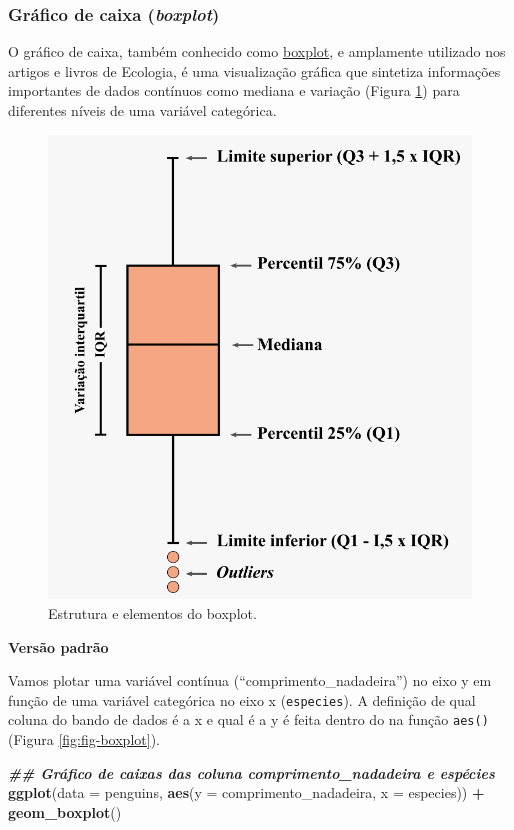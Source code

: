 \documentclass[
]{article}
\newenvironment{Shaded}{\begin{snugshade}}{\end{snugshade}}
\newcommand{\AttributeTok}[1]{\textcolor[rgb]{0.13,0.29,0.53}{#1}}
\newcommand{\DocumentationTok}[1]{\textcolor[rgb]{0.56,0.35,0.01}{\textbf{\textit{#1}}}}
\newcommand{\FunctionTok}[1]{\textcolor[rgb]{0.13,0.29,0.53}{\textbf{#1}}}
\newcommand{\NormalTok}[1]{#1}
\newcommand{\SpecialCharTok}[1]{\textcolor[rgb]{0.81,0.36,0.00}{\textbf{#1}}}
\begin{document}
\hypertarget{gruxe1fico-de-caixa-boxplot}{%
\subsubsection{\texorpdfstring{Gráfico de caixa (\emph{boxplot})}{Gráfico de caixa (boxplot)}}\label{gruxe1fico-de-caixa-boxplot}}

O gráfico de caixa, também conhecido como \href{https://www.data-to-viz.com/caveat/boxplot.html}{boxplot}, e amplamente utilizado nos artigos e livros de Ecologia, é uma visualização gráfica que sintetiza informações importantes de dados contínuos como mediana e variação (Figura \ref{fig:fig-boxplot-desc}) para diferentes níveis de uma variável categórica.

\begin{figure}
\includegraphics[width=0.75\linewidth,height=0.75\textheight]{figures/cap06_fig03} \caption{Estrutura e elementos do boxplot.}\label{fig:fig-boxplot-desc}
\end{figure}

\textbf{Versão padrão}

Vamos plotar uma variável contínua (``comprimento\_nadadeira'') no eixo y em função de uma variável categórica no eixo x (\texttt{especies}). A definição de qual coluna do bando de dados é a x e qual é a y é feita dentro do na função \texttt{aes()} (Figura \ref{fig:fig-boxplot}).

\begin{Shaded}
\begin{Highlighting}[]
\DocumentationTok{\#\# Gráfico de caixas das coluna comprimento\_nadadeira e espécies}
\FunctionTok{ggplot}\NormalTok{(}\AttributeTok{data =}\NormalTok{ penguins, }
       \FunctionTok{aes}\NormalTok{(}\AttributeTok{y =}\NormalTok{ comprimento\_nadadeira, }\AttributeTok{x =}\NormalTok{ especies)) }\SpecialCharTok{+}
    \FunctionTok{geom\_boxplot}\NormalTok{()}
\end{Highlighting}
\end{Shaded}
\end{document}
